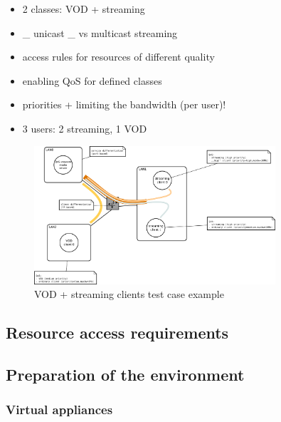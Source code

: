 \documentclass[11pt]{book}
\begin{document}
        \begin{itemize}
          \item 2 classes: VOD + streaming
          \item \_ unicast \_ vs multicast streaming
          \item access rules for resources of different quality
          \item enabling QoS for defined classes
          \item priorities + limiting the bandwidth (per user)!
          \item 3 users: 2 streaming, 1 VOD
        \end{itemize}

        \begin{figure}[H]
          \begin{center}
            \includegraphics[width=0.8\textwidth]{img/test-case/diagram.pdf}
          \end{center}

          \caption{VOD + streaming clients test case example}
        \end{figure}


      \subsection{Resource access requirements}

      \subsection{Preparation of the environment}
      \label{sub:case:prep}

        \subsubsection{Virtual appliances}
        \label{ssub:case:prep:va}
\end{document}
